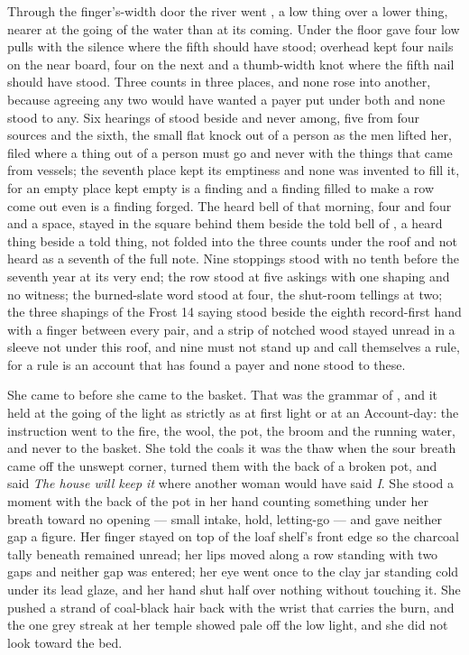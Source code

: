 Through the finger's-width door the river went , a low thing over a lower thing, nearer at the going of the water than at its coming. Under the floor  gave four low pulls with the silence where the fifth should have stood; overhead  kept four nails on the near board, four on the next and a thumb-width knot where the fifth nail should have stood. Three counts in three places, and none rose into another, because agreeing any two would have wanted a payer put under both and none stood to any. Six hearings of  stood beside and never among, five from four sources and the sixth, the small flat knock out of a person as the men lifted her, filed where a thing out of a person must go and never with the things that came from vessels; the seventh place kept its emptiness and none was invented to fill it, for an empty place kept empty is a finding and a finding filled to make a row come out even is a finding forged. The heard bell of that morning, four and four and a space, stayed in the square behind them beside the told bell of , a heard thing beside a told thing, not folded into the three counts under the roof and not heard as a seventh of the full note. Nine stoppings stood with no tenth before the seventh year at its very end; the row stood at five askings with one shaping and no witness; the burned-slate word stood at four, the shut-room tellings at two; the three shapings of the Frost 14 saying stood beside the eighth record-first hand with a finger between every pair, and a strip of notched wood stayed unread in a sleeve not under this roof, and nine must not stand up and call themselves a rule, for a rule is an account that has found a payer and none stood to these.

\scenebreak

She came to  before she came to the basket. That was the grammar of , and it held at the going of the light as strictly as at first light or at an Account-day: the instruction went to the fire, the wool, the pot, the broom and the running water, and never to the basket. She told the coals it was the thaw when the sour breath came off the unswept corner, turned them with the back of a broken pot, and said \emph{The house will keep it} where another woman would have said \emph{I}. She stood a moment with the back of the pot in her hand counting something under her breath toward no opening --- small intake, hold, letting-go --- and gave neither gap a figure. Her finger stayed on top of the loaf shelf's front edge so the charcoal tally beneath remained unread; her lips moved along a row standing with two gaps and neither gap was entered; her eye went once to the clay jar standing cold under its lead glaze, and her hand shut half over nothing without touching it. She pushed a strand of coal-black hair back with the wrist that carries the burn, and the one grey streak at her temple showed pale off the low light, and she did not look toward the bed.

